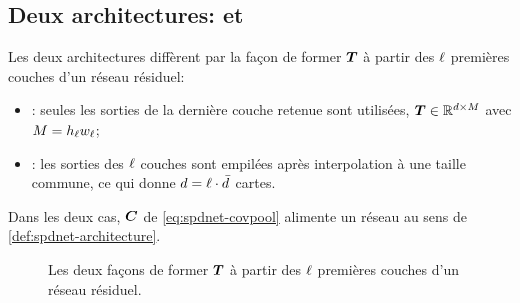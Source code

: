 
\subsection{Deux architectures:  et }
\label{sec:spdnet-covpool-archi}

\begin{definition}
\label{def:spdnet-rcnet}
  Les deux architectures diffèrent par la façon de former $\boldsymbol{T}$ à partir des
  $\ell$ premières couches d'un réseau résiduel:
  \begin{itemize}
    \item {}: seules les sorties de la dernière couche retenue
      sont utilisées, $\boldsymbol{T}\in\mathbb{R}^{d\times M}$ avec
      $M=h_\ell w_\ell$;
    \item {}: les sorties des $\ell$ couches sont empilées
      après interpolation à une taille commune, ce qui donne
      $d=\ell\cdot\bar{d}$ cartes.
  \end{itemize}
  Dans les deux cas, $\boldsymbol{C}$ de \cref{eq:spdnet-covpool} alimente un réseau
  \SPDnet{} au sens de \cref{def:spdnet-architecture}.
\end{definition}

\begin{figure}[htb]
  \begin{center}
    \makebox[\textwidth][c]{}
  \end{center}
  \caption{Les deux façons de former $\boldsymbol{T}$ à partir des $\ell$ premières
    couches d'un réseau résiduel. %
  }
  \label{fig:spdnet-rcnet-srcnet}
\end{figure}

